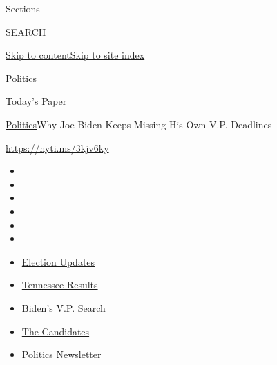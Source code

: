 Sections

SEARCH

\protect\hyperlink{site-content}{Skip to
content}\protect\hyperlink{site-index}{Skip to site index}

\href{https://www.nytimes3xbfgragh.onion/section/politics}{Politics}

\href{https://myaccount.nytimes3xbfgragh.onion/auth/login?response_type=cookie\&client_id=vi}{}

\href{https://www.nytimes3xbfgragh.onion/section/todayspaper}{Today's
Paper}

\href{/section/politics}{Politics}\textbar{}Why Joe Biden Keeps Missing
His Own V.P. Deadlines

\href{https://nyti.ms/3kjv6ky}{https://nyti.ms/3kjv6ky}

\begin{itemize}
\item
\item
\item
\item
\item
\item
\end{itemize}

\begin{itemize}
\item
  \href{https://www.nytimes3xbfgragh.onion/2020/08/07/us/elections/biden-vs-trump.html?action=click\&pgtype=Article\&state=default\&region=TOP_BANNER\&context=storylines_menu}{Election
  Updates}
\item
  \href{https://www.nytimes3xbfgragh.onion/interactive/2020/08/06/us/elections/results-tennessee-primary-elections.html?action=click\&pgtype=Article\&state=default\&region=TOP_BANNER\&context=storylines_menu}{Tennessee
  Results}
\item
  \href{https://www.nytimes3xbfgragh.onion/article/biden-vice-president-2020.html?action=click\&pgtype=Article\&state=default\&region=TOP_BANNER\&context=storylines_menu}{Biden's
  V.P. Search}
\item
  \href{https://www.nytimes3xbfgragh.onion/interactive/2019/us/politics/2020-presidential-candidates.html?action=click\&pgtype=Article\&state=default\&region=TOP_BANNER\&context=storylines_menu}{The
  Candidates}
\item
  \href{https://www.nytimes3xbfgragh.onion/newsletters/politics?action=click\&pgtype=Article\&state=default\&region=TOP_BANNER\&context=storylines_menu}{Politics
  Newsletter}
\end{itemize}


